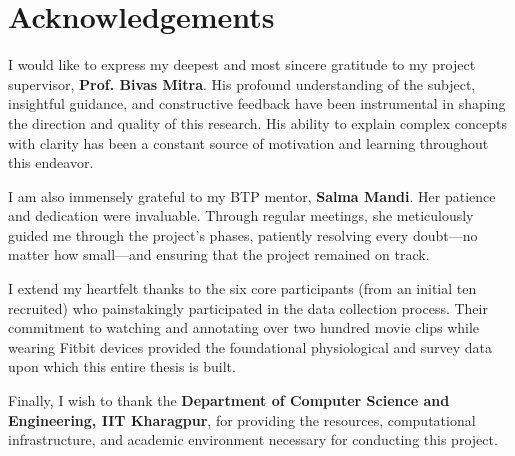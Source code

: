 \documentclass[11pt, a4paper]{report}
\begin{document}
\chapter*{Acknowledgements}

I would like to express my deepest and most sincere gratitude to my project supervisor, \textbf{Prof. Bivas Mitra}. His profound understanding of the subject, insightful guidance, and constructive feedback have been instrumental in shaping the direction and quality of this research. His ability to explain complex concepts with clarity has been a constant source of motivation and learning throughout this endeavor.

\vspace{1em}
I am also immensely grateful to my BTP mentor, \textbf{Salma Mandi}. Her patience and dedication were invaluable. Through regular meetings, she meticulously guided me through the project's phases, patiently resolving every doubt---no matter how small---and ensuring that the project remained on track.

\vspace{1em}
I extend my heartfelt thanks to the six core participants (from an initial ten recruited) who painstakingly participated in the data collection process. Their commitment to watching and annotating over two hundred movie clips while wearing Fitbit devices provided the foundational physiological and survey data upon which this entire thesis is built.

\vspace{1em}
Finally, I wish to thank the \textbf{Department of Computer Science and Engineering, IIT Kharagpur}, for providing the resources, computational infrastructure, and academic environment necessary for conducting this project.
\cleardoublepage

\tableofcontents
\cleardoublepage

\end{document}
